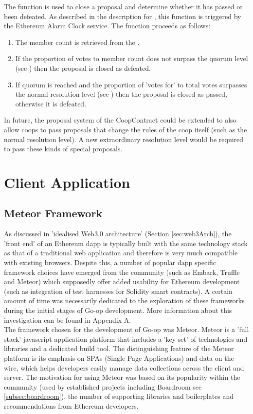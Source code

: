 The  function is used to close a proposal and determine whether it has passed or been defeated. As described in the description for , this function is triggered by the Ethereum Alarm Clock service. The function proceeds as follows:
\begin{enumerate}
\item The member count is retrieved from the . 
\item If the proportion of votes to member count does not surpass the quorum level (see ) then the proposal is closed as defeated. 
\item If quorum is reached and the proportion of 'votes for' to total votes surpasses the normal resolution level (see ) then the proposal is closed as passed, otherwise it is defeated.
\end{enumerate}

In future, the proposal system of the CoopContract could be extended to also allow coops to pass proposals that change the rules of the coop itself (such as the normal resolution level). A new extraordinary resolution level would be required to pass these kinds of special proposals.\\

\section{Client Application}
\subsection{Meteor Framework}
As discussed in 'idealised Web3.0 architecture' (Section \ref{sec:web3Arch}), the 'front end' of an Ethereum dapp is typically built with the same technology stack as that of a traditional web application and therefore is very much compatible with existing browsers. Despite this, a number of popular dapp specific framework choices have emerged from the community (such as Embark\cite{Embark}, Truffle\cite{Truffle} and Meteor\cite{Meteor}) which supposedly offer added usability for Ethereum development (such as integration of test harnesses for Solidity smart contracts). A certain amount of time was necessarily dedicated to the exploration of these frameworks during the initial stages of Go-op development. More information about this investigation can be found in Appendix A.\\

The framework chosen for the development of Go-op was Meteor\cite{Meteor}. Meteor is a 'full stack' javascript application platform that includes a 'key set' of technologies and libraries and a dedicated build tool. The distinguishing feature of the Meteor platform is its emphasis on SPAs (Single Page Applications) and data on the wire, which helps developers easily manage data collections across the client and server. The motivation for using Meteor was based on its popularity within the community (used by established projects including Boardroom see \ref{subsec:boardroom}), the number of supporting libraries and boilerplates and recommendations from Ethereum developers\cite{MeteorRef}.\\

